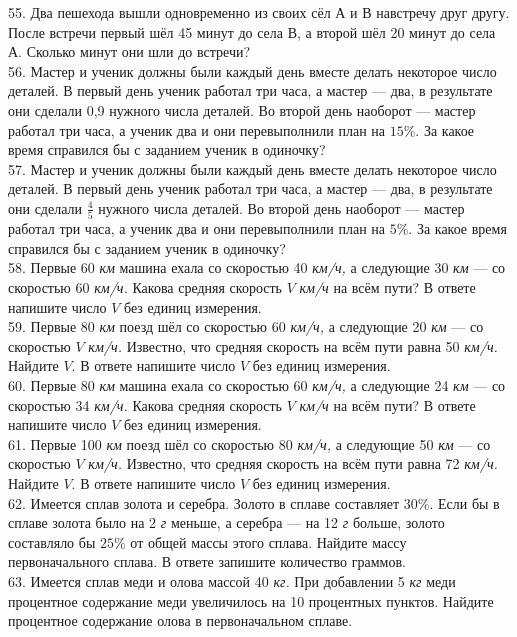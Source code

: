 \documentclass[12pt]{article}
\begin{document}
55. Два пешехода вышли одновременно из своих сёл А и В навстречу друг другу. После встречи первый шёл 45 минут до села В, а второй шёл 20 минут до села А. Сколько минут они шли до встречи?\\
56. Мастер и ученик должны были каждый день вместе делать некоторое число деталей. В первый день ученик работал три часа, а мастер --- два, в результате они сделали 0,9 нужного числа деталей. Во второй день наоборот --- мастер работал три часа, а ученик два и они перевыполнили план на $15\%.$ За какое время справился бы с заданием ученик в одиночку?\\
57. Мастер и ученик должны были каждый день вместе делать некоторое число деталей. В первый день ученик работал три часа, а мастер --- два, в результате они сделали $\frac{4}{5}$ нужного числа деталей. Во второй день наоборот --- мастер работал три часа, а ученик два и они перевыполнили план на $5\%.$ За какое время справился бы с заданием ученик в одиночку?\\
58. Первые 60 {\it км} машина ехала со скоростью 40 {\it км/ч,} а следующие 30 {\it км} --- со скоростью 60 {\it км/ч.} Какова средняя скорость $V$ {\it км/ч} на всём пути? В ответе напишите число $V$ без единиц измерения.\\
59. Первые 80 {\it км} поезд шёл со скоростью 60 {\it км/ч,} а следующие 20 {\it км} --- со скоростью $V$ {\it км/ч.} Известно, что средняя скорость на всём пути равна 50 {\it км/ч.} Найдите $V.$ В ответе напишите число $V$ без единиц измерения.\\
60. Первые 80 {\it км} машина ехала со скоростью 60 {\it км/ч,} а следующие 24 {\it км} --- со скоростью 34 {\it км/ч.} Какова средняя скорость $V$ {\it км/ч} на всём пути? В ответе напишите число $V$ без единиц измерения.\\
61. Первые 100 {\it км} поезд шёл со скоростью 80 {\it км/ч,} а следующие 50 {\it км} --- со скоростью $V$ {\it км/ч.} Известно, что средняя скорость на всём пути равна 72 {\it км/ч.} Найдите $V.$ В ответе напишите число $V$ без единиц измерения.\\
62. Имеется сплав золота и серебра. Золото в сплаве составляет $30\%.$ Если бы в сплаве золота было на 2 {\it г} меньше, а серебра --- на 12 {\it г} больше, золото составляло бы $25\%$ от общей массы этого сплава. Найдите массу первоначального сплава. В ответе запишите количество граммов.\\
63. Имеется сплав меди и олова массой 40 {\it кг.} При добавлении 5 {\it кг} меди процентное содержание меди увеличилось на 10 процентных пунктов. Найдите процентное содержание олова в первоначальном сплаве.\\
\end{document}
